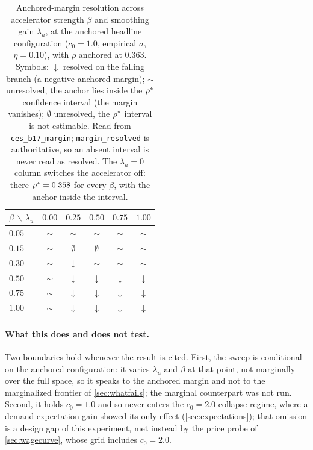\begin{table}[htbp]
\centering
\small
\caption{Anchored-margin resolution across accelerator strength $\beta$ and
smoothing gain $\lambda_u$, at the anchored headline configuration
($c_0 = 1.0$, empirical $\sigma$, $\eta = 0.10$), with $\rho$ anchored at
$0.363$. Symbols: $\downarrow$ resolved on the falling branch (a negative
anchored margin); $\sim$ unresolved, the anchor lies inside the $\rho^{\ast}$
confidence interval (the margin vanishes); $\emptyset$ unresolved, the
$\rho^{\ast}$ interval is not estimable. Read from \texttt{ces\_b17\_margin};
\texttt{margin\_resolved} is authoritative, so an absent interval is never read
as resolved. The $\lambda_u = 0$ column switches the accelerator off: there
$\rho^{\ast} = 0.358$ for every $\beta$, with the anchor inside the interval.}
\label{tab:b17}
\begin{tabular}{lccccc}
\toprule
$\beta \,\backslash\, \lambda_u$ & $0.00$ & $0.25$ & $0.50$ & $0.75$ & $1.00$\\
\midrule  %
$0.05$ & $\sim$ & $\sim$ & $\sim$ & $\sim$ & $\sim$\\
$0.15$ & $\sim$ & $\emptyset$ & $\emptyset$ & $\sim$ & $\sim$\\
$0.30$ & $\sim$ & $\downarrow$ & $\sim$ & $\sim$ & $\sim$\\
$0.50$ & $\sim$ & $\downarrow$ & $\downarrow$ & $\downarrow$ & $\downarrow$\\
$0.75$ & $\sim$ & $\downarrow$ & $\downarrow$ & $\downarrow$ & $\downarrow$\\
$1.00$ & $\sim$ & $\downarrow$ & $\downarrow$ & $\downarrow$ & $\downarrow$\\
\bottomrule
\end{tabular}
\end{table}

\paragraph{What this does and does not test.} Two boundaries hold whenever the
result is cited. First, the sweep is conditional on the anchored configuration:
it varies $\lambda_u$ and $\beta$ at that point, not marginally over the full
space, so it speaks to the anchored margin and not to the marginalized frontier
of \cref{sec:whatfails}; the marginal counterpart was not run. Second, it holds
$c_0 = 1.0$ and so never enters the $c_0 = 2.0$ collapse regime, where a
demand-expectation gain showed its only effect (\cref{sec:expectations}); that
omission is a design gap of this experiment, met instead by the price probe of
\cref{sec:wagecurve}, whose grid includes $c_0 = 2.0$.

